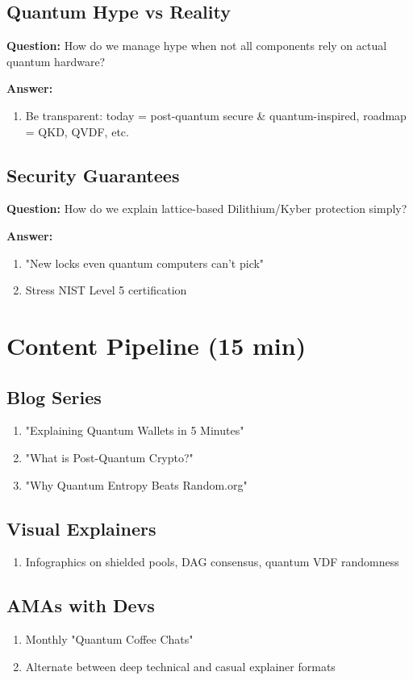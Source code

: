 \documentclass[11pt,a4paper]{article}
\begin{document}
\subsection{Quantum Hype vs Reality}
\textbf{Question:} How do we manage hype when not all components rely on actual quantum hardware?

\textbf{Answer:}
\begin{enumerate}
\item Be transparent: today = post-quantum secure \& quantum-inspired, roadmap = QKD, QVDF, etc.
\end{enumerate}

\subsection{Security Guarantees}
\textbf{Question:} How do we explain lattice-based Dilithium/Kyber protection simply?

\textbf{Answer:}
\begin{enumerate}
\item "New locks even quantum computers can't pick"
\item Stress NIST Level 5 certification
\end{enumerate}

\section{Content Pipeline (15 min)}

\subsection{Blog Series}
\begin{enumerate}
\item "Explaining Quantum Wallets in 5 Minutes"
\item "What is Post-Quantum Crypto?"
\item "Why Quantum Entropy Beats Random.org"
\end{enumerate}

\subsection{Visual Explainers}
\begin{enumerate}
\item Infographics on shielded pools, DAG consensus, quantum VDF randomness
\end{enumerate}

\subsection{AMAs with Devs}
\begin{enumerate}
\item Monthly "Quantum Coffee Chats"
\item Alternate between deep technical and casual explainer formats
\end{enumerate}
\end{document}
